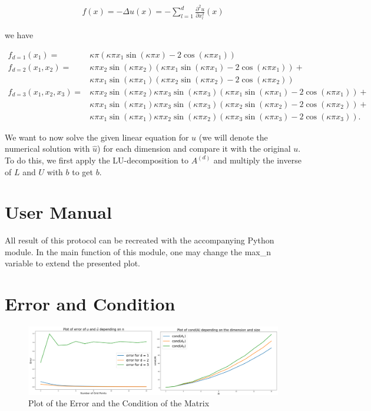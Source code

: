 \documentclass[refman]{article}
\theoremstyle{definition}
\begin{document}
\begin{align*}
	f(x) = - \Delta u(x) = -\sum_{l = 1}^d \frac{\partial^2 u}{\partial x_l^2} (x)
\end{align*}

we have

\begin{align*}
	f_{d=1} (x_1) =& \kappa \pi \left( \kappa \pi x_1 \sin ( \kappa \pi x ) - 2 \cos( \kappa \pi x_1) \right) \\
%	
	f_{d=2} (x_1, x_2) =& \kappa \pi x_2 \sin( \kappa \pi x_2) \left(  \kappa \pi x_1 \sin(\kappa \pi x_1) - 2 \cos ( \kappa \pi x_1) \right) + \\ 
	& \kappa \pi x_1 \sin( \kappa \pi x_1) \left(  \kappa \pi x_2 \sin(\kappa \pi x_2) - 2 \cos ( \kappa \pi x_2) \right) \\
%
	f_{d=3} (x_1, x_2, x_3) =& \kappa \pi x_2 \sin( \kappa \pi x_2) \kappa \pi x_3 \sin(\kappa \pi x_3)  \left(  \kappa \pi x_1 \sin(\kappa \pi x_1) - 2 \cos ( \kappa \pi x_1) \right) + \\
	& \kappa \pi x_1 \sin( \kappa \pi x_1) \kappa \pi x_3 \sin(\kappa \pi x_3)  \left(  \kappa \pi x_2 \sin(\kappa \pi x_2) - 2 \cos ( \kappa \pi x_2) \right) + \\
	& \kappa \pi x_1 \sin( \kappa \pi x_1) \kappa \pi x_2 \sin(\kappa \pi x_2)  \left(  \kappa \pi x_3 \sin(\kappa \pi x_3) - 2 \cos ( \kappa \pi x_3) \right) \text{.}
\end{align*}

We want to now solve the given linear equation for \(u\) (we will denote the numerical solution with \(\hat{u}\)) for each dimension and compare it with the original \(u\). To do this, we first apply the LU-decomposition to \(A^{(d)}\) and multiply the inverse of \(L\) and \(U\) with \(b\) to get \(b\).

\section{User Manual}

All result of this protocol can be recreated with the accompanying Python module. In the main function of this module, one may change the max\_n variable to extend the presented plot.

\section{Error and Condition}

\begin{figure}[h]
	\includegraphics[width=\linewidth]{graphics/error_condition.png}
	\caption{Plot of the Error and the Condition of the Matrix}
	\label{fig:plot_error}
\end{figure}
\end{document}
